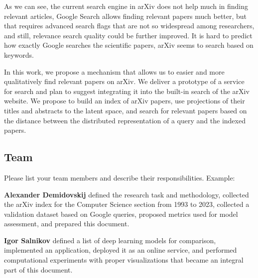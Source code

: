 \documentclass{article}
\begin{document}
    As we can see, the current search engine in arXiv does not help much in finding relevant articles, Google Search allows finding relevant papers much better, but that requires advanced search flags that are not so widespread among researchers, and still, relevance search quality could be further improved. It is hard to predict how exactly Google searches the scientific papers, arXiv seems to search based on keywords.
    
    In this work, we propose a mechanism that allows us to easier and more qualitatively find relevant papers on arXiv. We deliver a prototype of a service for search and plan to suggest integrating it into the built-in search of the arXiv website. We propose to build an index of arXiv papers, use projections of their titles and abstracts to the latent space, and search for relevant papers based on the distance between the distributed representation of a query and the indexed papers.
    

    \subsection{Team}
        Please list your team members and describe their responsibilities. Example:

        \textbf{Alexander Demidovskij} defined the research task and methodology, collected the arXiv index for the Computer Science section from 1993 to 2023, collected a validation dataset based on Google queries, proposed metrics used for model assessment, and prepared this document.

        \textbf{Igor Salnikov} defined a list of deep learning models for comparison, implemented an application, deployed it as an online service, and performed computational experiments with proper visualizations that became an integral part of this document.
\end{document}
